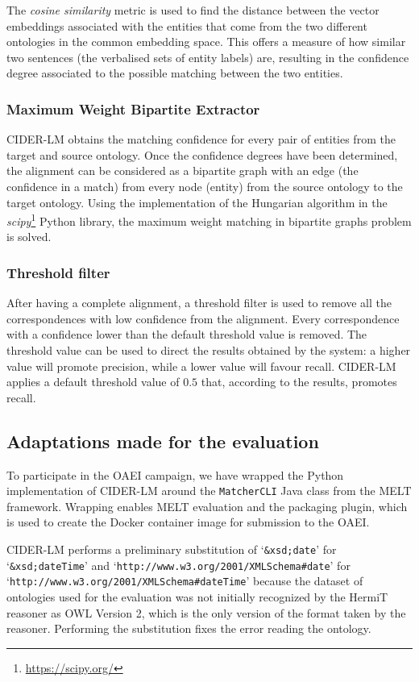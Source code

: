 \documentclass[
]{ceurart}
\begin{document}
The \textit{cosine similarity} metric is used to find the distance between the vector embeddings associated with the entities that come from the two different ontologies in the common embedding space. This offers a measure of how similar two sentences (the verbalised sets of entity labels) are, resulting in the confidence degree associated to the possible matching between the two entities. 

\subsubsection{Maximum Weight Bipartite Extractor}

CIDER-LM obtains the matching confidence for every pair of entities from the target and source ontology. Once the confidence degrees have been determined, the alignment can be considered as a bipartite graph with an edge (the confidence in a match) from every node (entity) from the source ontology to the target ontology. Using the implementation of the Hungarian algorithm in the \textit{scipy}\footnote{\url{https://scipy.org/}} Python library, the maximum weight matching in bipartite graphs problem is solved. 

\subsubsection{Threshold filter}

After having a complete alignment, a threshold filter is used to remove all the correspondences with low confidence from the alignment. Every correspondence with a confidence lower than the default threshold value is removed. The threshold value can be used to direct the results obtained by the system: a higher value will promote precision, while a lower value will favour recall. CIDER-LM applies a default threshold value of $0.5$ that, according to the results, promotes recall.

\subsection{Adaptations made for the evaluation}

To participate in the OAEI campaign, we have wrapped the Python implementation of CIDER-LM around the \verb|MatcherCLI| Java class from the MELT framework. Wrapping enables MELT evaluation and the packaging plugin, which is used to create the Docker container image for submission to the OAEI.

CIDER-LM performs a preliminary substitution of `\verb|&xsd;date|' for `\verb|&xsd;dateTime|' and `\verb|http://www.w3.org/2001/XMLSchema#date|' for `\verb|http://www.w3.org/2001/XMLSchema#dateTime|' because the dataset of ontologies used for the evaluation was not initially recognized by the HermiT reasoner as OWL Version 2, which is the only version of the format taken by the reasoner. Performing the substitution fixes the error reading the ontology.
\end{document}
